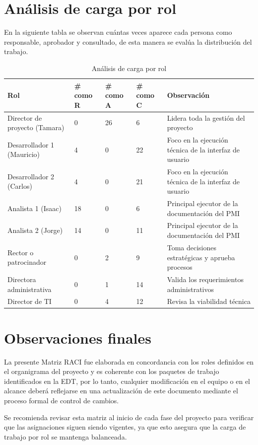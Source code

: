 \documentclass[11pt,spanish]{article}
\begin{document}
\section{Análisis de carga por rol}

En la siguiente tabla se observan cuántas veces aparece cada persona como responsable, aprobador y consultado, de esta manera se evalúa la distribución del trabajo.


\begin{table}[H]
\centering
\caption{Análisis de carga por rol}
\label{tab:analisis-carga-rol}
{\small
\setlength{\tabcolsep}{3.5pt}
\begin{tabularx}{\textwidth}{p{4.2cm} C{1.5cm} C{1.5cm} C{1.5cm} Y}
\toprule
\textbf{Rol} & \textbf{\# como R} & \textbf{\# como A} & \textbf{\# como C} & \textbf{Observación} \\
\midrule
Director de proyecto (Tamara) & 0 & 26 & 6 & Lidera toda la gestión del proyecto \\
Desarrollador 1 (Mauricio) & 4 & 0 & 22 & Foco en la ejecución técnica de la interfaz de usuario \\
Desarrollador 2 (Carlos) & 4 & 0 & 21 & Foco en la ejecución técnica de la interfaz de usuario \\
Analista 1 (Isaac) & 18 & 0 & 6 & Principal ejecutor de la documentación del PMI \\
Analista 2 (Jorge) & 14 & 0 & 11 & Principal ejecutor de la documentación del PMI \\
Rector o patrocinador & 0 & 2 & 9 & Toma decisiones estratégicas y aprueba procesos \\
Directora administrativa & 0 & 1 & 14 & Valida los requerimientos administrativos \\
Director de TI & 0 & 4 & 12 & Revisa la viabilidad técnica \\
\bottomrule
\end{tabularx}
}
\end{table}


\section{Observaciones finales}

La presente Matriz RACI fue elaborada en concordancia con los roles definidos en el organigrama del proyecto y es coherente con los paquetes de trabajo identificados en la EDT, por lo tanto, cualquier modificación en el equipo o en el alcance deberá reflejarse en una actualización de este documento mediante el proceso formal de control de cambios.


Se recomienda revisar esta matriz al inicio de cada fase del proyecto para verificar que las asignaciones siguen siendo vigentes, ya que esto asegura que la carga de trabajo por rol se mantenga balanceada.
\end{document}
